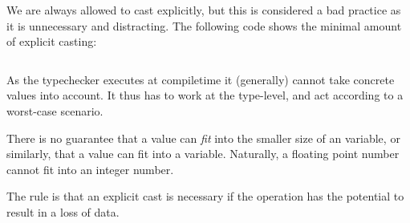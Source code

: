 We are always allowed to cast explicitly, but this is considered a bad practice as it is unnecessary and distracting. The following code shows the minimal amount of explicit casting:

\inputminted{csharp}{\context/answer/Casting.cs}

As the typechecker executes at compiletime it (generally) cannot take concrete values into account. It thus has to work at the type-level, and act according to a worst-case scenario.

There is no guarantee that a  value can \textsl{fit} into the smaller size of an  variable, or similarly, that a  value can fit into a  variable. Naturally, a floating point number cannot fit into an integer number.

The rule is that an explicit cast is necessary if the operation has the potential to result in a loss of data.

